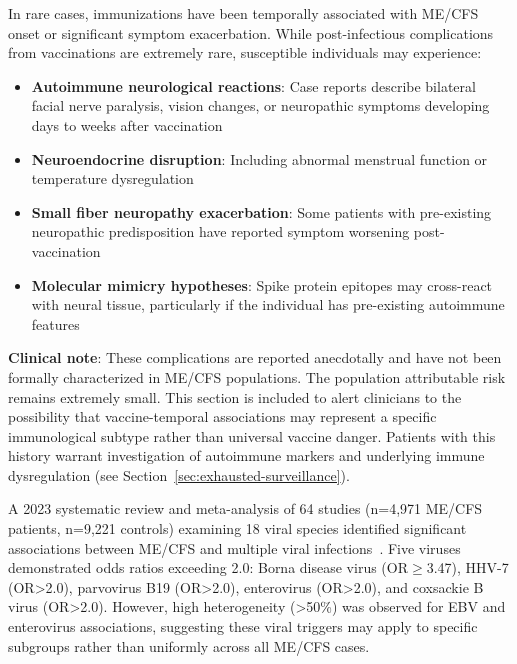 In rare cases, immunizations have been temporally associated with ME/CFS onset or significant symptom exacerbation. While post-infectious complications from vaccinations are extremely rare, susceptible individuals may experience:

\begin{itemize}
    \item \textbf{Autoimmune neurological reactions}: Case reports describe bilateral facial nerve paralysis, vision changes, or neuropathic symptoms developing days to weeks after vaccination
    \item \textbf{Neuroendocrine disruption}: Including abnormal menstrual function or temperature dysregulation
    \item \textbf{Small fiber neuropathy exacerbation}: Some patients with pre-existing neuropathic predisposition have reported symptom worsening post-vaccination
    \item \textbf{Molecular mimicry hypotheses}: Spike protein epitopes may cross-react with neural tissue, particularly if the individual has pre-existing autoimmune features
\end{itemize}

\textbf{Clinical note}: These complications are reported anecdotally and have not been formally characterized in ME/CFS populations. The population attributable risk remains extremely small. This section is included to alert clinicians to the possibility that vaccine-temporal associations may represent a specific immunological subtype rather than universal vaccine danger. Patients with this history warrant investigation of autoimmune markers and underlying immune dysregulation (see Section~\ref{sec:exhausted-surveillance}).

\begin{observation}
\label{obs:viral-meta}
A 2023 systematic review and meta-analysis of 64 studies (n=4,971 ME/CFS patients, n=9,221 controls) examining 18 viral species identified significant associations between ME/CFS and multiple viral infections~\cite{hwang2023viral}. Five viruses demonstrated odds ratios exceeding 2.0: Borna disease virus (OR$\geq$3.47), HHV-7 (OR>2.0), parvovirus B19 (OR>2.0), enterovirus (OR>2.0), and coxsackie B virus (OR>2.0). However, high heterogeneity (>50\%) was observed for EBV and enterovirus associations, suggesting these viral triggers may apply to specific subgroups rather than uniformly across all ME/CFS cases.
\end{observation}

